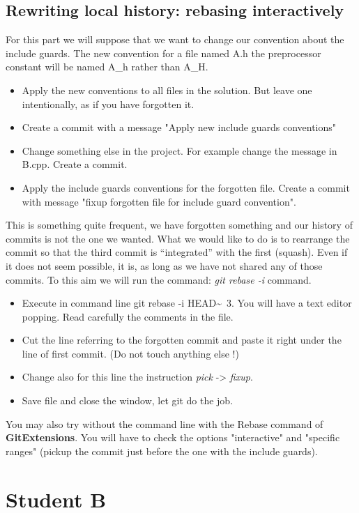 \documentclass[11pt,amsfonts,amsmath]{article}
\begin{document}
\subsection{Rewriting local history: rebasing interactively}\label{studenta:interactive}
For this part we will suppose that we want to change our convention about the include guards. The new convention for a file named A.h the preprocessor constant will be named A\_h rather than A\_H.
\begin{itemize}
\item Apply the new conventions to all files in the solution. But leave one intentionally, as if you have forgotten it.
\item Create a commit with a message "Apply new include guards conventions"
\item Change something else in the project. For example change the message in B.cpp. Create a commit.
\item Apply the include guards conventions for the forgotten file. Create a commit with message "fixup forgotten file for include guard convention".
\end{itemize}
This is something quite frequent, we have forgotten something and our history of commits is not the one we wanted. What we would like to do is to rearrange the commit so that the third commit is ``integrated'' with the first (squash). Even if it does not seem possible, it is, as long as we have not shared any of those commits. To this aim we will run the command: \emph{git rebase -i} command.
\begin{itemize}
\item Execute in command line git rebase -i HEAD\~~3. You will have a text editor popping. Read carefully the comments in the file.
\item Cut the line referring to the forgotten commit and paste it right under the line of first commit. (Do not touch anything else !)
\item Change also for this line the instruction \emph{pick} -> \emph{fixup}.
\item Save file and close the window, let git do the job.
\end{itemize}
 You may also try without the command line with the Rebase command of \textbf{GitExtensions}. You will have to check the options "interactive" and "specific ranges" (pickup the commit just before the one with the include guards).
\section{Student B}
\end{document}
